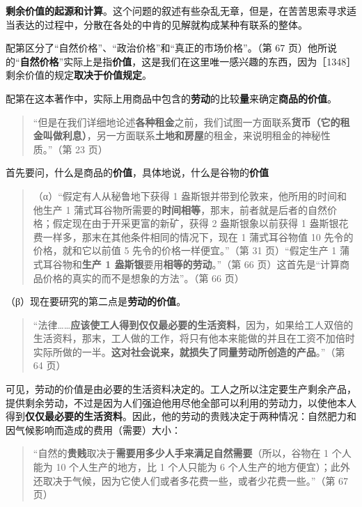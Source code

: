 \textbf{剩余价值的起源和计算}。这个问题的叙述有些杂乱无章，但是，在苦苦思索寻求适当表达的过程中，分散在各处的中肯的见解就构成某种有联系的整体。

配第区分了“自然价格”、“政治价格”和“真正的市场价格”。（第 67 页）他所说的“\textbf{自然价格}”实际上是指\textbf{价值}，这是我们在这里唯一感兴趣的东西，因为［1348］剩余价值的规定\textbf{取决于价值规定}。

配第在这本著作中，实际上用商品中包含的\textbf{劳动}的比较\textbf{量}来确定\textbf{商品的价值}。

\begin{quote}“但是在我们详细地论述\textbf{各种租金}之前，我们试图一方面联系\textbf{货币（它的租金叫做利息）}，另一方面联系\textbf{土地和房屋}的租金，来说明租金的神秘性质。”（第 23 页）\end{quote}

首先要问，什么是商品的\textbf{价值}，具体地说，什么是谷物的\textbf{价值}

\begin{quote}（α）“假定有人从秘鲁地下获得 1 盎斯银并带到伦敦来，他所用的时间和他生产 1 蒲式耳谷物所需要的\textbf{时间相等}，那末，前者就是后者的自然价格；假定现在由于开采更富的新矿，获得 2 盎斯银象以前获得 1 盎斯银花费一样多，那末在其他条件相同的情况下，现在 1 蒲式耳谷物值 10 先令的价格，就和它以前值 5 先令的价格一样便宜。”（第 31 页）“假定生产 1 蒲式耳谷物和\textbf{生产 1 盎斯银}要用\textbf{相等的劳动}。”（第 66 页）这首先是“计算商品价格的真实的而不是想象的方法”。（第 66 页）\end{quote}

（β）现在要研究的第二点是\textbf{劳动的价值}。

\begin{quote}“法律……\textbf{应该使工人得到仅仅最必要的生活资料}，因为，如果给工人双倍的生活资料，那末，工人做的工作，将只有他本来能做的并且在工资不加倍时实际所做的一半。\textbf{这对社会说来，就损失了同量劳动所创造的产品}。”（第 64 页）\end{quote}

可见，劳动的价值是由必要的生活资料决定的。工人之所以注定要生产剩余产品，提供剩余劳动，不过是因为人们强迫他用尽他全部可以利用的劳动力，以使他本人得到\textbf{仅仅最必要的生活资料}。因此，他的劳动的贵贱决定于两种情况：自然肥力和因气候影响而造成的费用（需要）大小：

\begin{quote}“自然的\textbf{贵贱}取决于\textbf{需要用多少人手来满足自然需要}（所以，谷物在 1 个人能为 10 个人生产的地方，比 1 个人只能为 6 个人生产的地方便宜）；此外还取决于气候，因为它使人们或者多花费一些，或者少花费一些。”（第 67 页）\end{quote}

